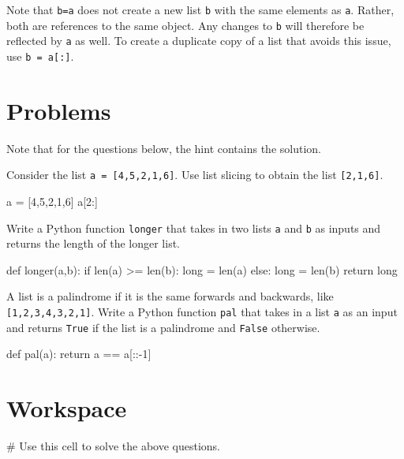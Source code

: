 \documentclass{ximera}
\begin{document}
Note that \verb|b=a| does not create a new list \verb|b| with the same elements as \verb|a|. Rather, both are references to the same object. Any changes to \verb|b| will therefore be reflected by \verb|a| as well. To create a duplicate copy of a list that avoids this issue, use \verb|b = a[:]|.

\section{Problems}

Note that for the questions below, the hint contains the solution.

\begin{question}
	Consider the list \verb|a = [4,5,2,1,6]|. Use list slicing to obtain the list \verb|[2,1,6]|.
	\begin{hint}
\begin{sageCell}
a = [4,5,2,1,6]
a[2:]
\end{sageCell}
	\end{hint}
\end{question}

\begin{question}
Write a Python function \verb|longer| that takes in two lists \verb|a| and \verb|b| as inputs and returns the length of the longer list.
	\begin{hint}
\begin{sageCell}
def longer(a,b):
        if len(a) >= len(b):
                long = len(a)
        else:
                long = len(b)
        return long
\end{sageCell}
	\end{hint}
\end{question}

\begin{question}
A list is a palindrome if it is the same forwards and backwards, like \verb|[1,2,3,4,3,2,1]|. Write a Python function \verb|pal| that takes in a list \verb|a| as an input and returns \verb|True| if the list is a palindrome and \verb|False| otherwise.
	\begin{hint}
\begin{sageCell}
def pal(a):
        return a == a[::-1]
\end{sageCell}
	\end{hint}
\end{question}

\section{Workspace}

\begin{sageCell}
# Use this cell to solve the above questions.
\end{sageCell}
\end{document}
